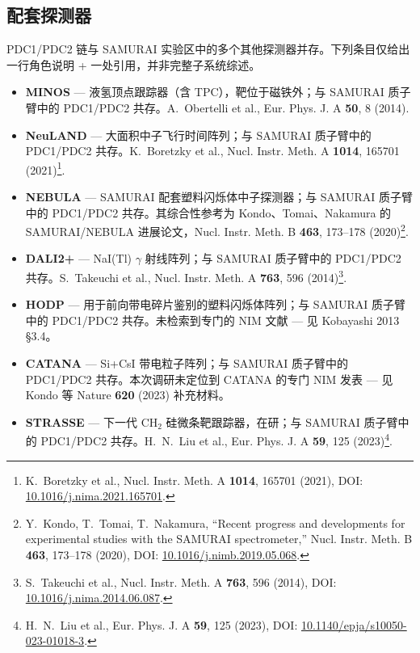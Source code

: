 \documentclass[a4paper, 11pt]{article}
\begin{document}
\subsection{配套探测器}
PDC1/PDC2 链与 SAMURAI 实验区中的多个其他探测器并存。下列条目仅给出一行角色说明 + 一处引用，并非完整子系统综述。
\begin{itemize}
  \item \textbf{MINOS} --- 液氢顶点跟踪器（含 TPC），靶位于磁铁外；与 SAMURAI 质子臂中的 PDC1/PDC2 共存。A.~Obertelli et al., Eur. Phys. J. A \textbf{50}, 8 (2014).
  \item \textbf{NeuLAND} --- 大面积中子飞行时间阵列；与 SAMURAI 质子臂中的 PDC1/PDC2 共存。K.~Boretzky et al., Nucl. Instr. Meth. A \textbf{1014}, 165701 (2021)\footnote{\label{fn:boretzky2021}K.~Boretzky et al., Nucl. Instr. Meth. A \textbf{1014}, 165701 (2021), DOI: \href{https://doi.org/10.1016/j.nima.2021.165701}{10.1016/j.nima.2021.165701}.}.
  \item \textbf{NEBULA} --- SAMURAI 配套塑料闪烁体中子探测器；与 SAMURAI 质子臂中的 PDC1/PDC2 共存。其综合性参考为 Kondo、Tomai、Nakamura 的 SAMURAI/NEBULA 进展论文，Nucl. Instr. Meth. B \textbf{463}, 173--178 (2020)\footnote{\label{fn:kondo2020nim}Y.~Kondo, T.~Tomai, T.~Nakamura, ``Recent progress and developments for experimental studies with the SAMURAI spectrometer,'' Nucl. Instr. Meth. B \textbf{463}, 173--178 (2020), DOI: \href{https://doi.org/10.1016/j.nimb.2019.05.068}{10.1016/j.nimb.2019.05.068}.}.
  \item \textbf{DALI2+} --- NaI(Tl) $\gamma$ 射线阵列；与 SAMURAI 质子臂中的 PDC1/PDC2 共存。S.~Takeuchi et al., Nucl. Instr. Meth. A \textbf{763}, 596 (2014)\footnote{\label{fn:takeuchi2014}S.~Takeuchi et al., Nucl. Instr. Meth. A \textbf{763}, 596 (2014), DOI: \href{https://doi.org/10.1016/j.nima.2014.06.087}{10.1016/j.nima.2014.06.087}.}.
  \item \textbf{HODP} --- 用于前向带电碎片鉴别的塑料闪烁体阵列；与 SAMURAI 质子臂中的 PDC1/PDC2 共存。未检索到专门的 NIM 文献 --- 见 Kobayashi 2013 §3.4。
  \item \textbf{CATANA} --- Si+CsI 带电粒子阵列；与 SAMURAI 质子臂中的 PDC1/PDC2 共存。本次调研未定位到 CATANA 的专门 NIM 发表 --- 见 Kondo 等 Nature \textbf{620} (2023) 补充材料。
  \item \textbf{STRASSE} --- 下一代 CH$_2$ 硅微条靶跟踪器，在研；与 SAMURAI 质子臂中的 PDC1/PDC2 共存。H.~N.~Liu et al., Eur. Phys. J. A \textbf{59}, 125 (2023)\footnote{\label{fn:liu2023}H.~N.~Liu et al., Eur. Phys. J. A \textbf{59}, 125 (2023), DOI: \href{https://doi.org/10.1140/epja/s10050-023-01018-3}{10.1140/epja/s10050-023-01018-3}.}.
\end{itemize}
\end{document}

